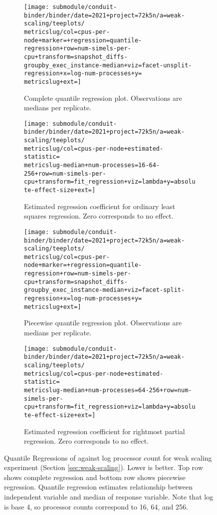 \begin{figure*}
  \centering

  \begin{subfigure}[b]{0.49\textwidth}
    \centering
    \texttt{[image: submodule/conduit-binder/binder/date=2021+project=72k5n/a=weak-scaling/teeplots/\\metricslug/col=cpus-per-node+marker=+regression=quantile-regression+row=num-simels-per-cpu+transform=snapshot\_diffs-groupby\_exec\_instance-median+viz=facet-unsplit-regression+x=log-num-processes+y=\\metricslug+ext=]}
    \caption{
      Complete quantile regression plot.
      Observations are medians per replicate.
    }
    \label{fig:weak-scaling-regression-quantile-\metricslug-complete-regression}
  \end{subfigure}%
  \hfill%
  \begin{subfigure}[b]{0.49\textwidth}
    \centering
    \texttt{[image: submodule/conduit-binder/binder/date=2021+project=72k5n/a=weak-scaling/teeplots/\\metricslug/col=cpus-per-node+estimated-statistic=\\metricslug-median+num-processes=16-64-256+row=num-simels-per-cpu+transform=fit\_regression+viz=lambda+y=absolute-effect-size+ext=]}
    \caption{Estimated regression coefficient for ordinary least squares regression. Zero corresponds to no effect.}
    \label{fig:weak-scaling-regression-quantile-\metricslug-complete-effect-size}
  \end{subfigure}

  \begin{subfigure}[b]{0.49\textwidth}
    \centering
    \texttt{[image: submodule/conduit-binder/binder/date=2021+project=72k5n/a=weak-scaling/teeplots/\\metricslug/col=cpus-per-node+marker=+regression=quantile-regression+row=num-simels-per-cpu+transform=snapshot\_diffs-groupby\_exec\_instance-median+viz=facet-split-regression+x=log-num-processes+y=\\metricslug+ext=]}
    \caption{
      Piecewise quantile regression plot.
      Observations are medians per replicate.
    }
    \label{fig:weak-scaling-regression-quantile-\metricslug-partial-regression}
  \end{subfigure}%
  \hfill%
  \begin{subfigure}[b]{0.49\textwidth}
    \centering
    \texttt{[image: submodule/conduit-binder/binder/date=2021+project=72k5n/a=weak-scaling/teeplots/\\metricslug/col=cpus-per-node+estimated-statistic=\\metricslug-median+num-processes=64-256+row=num-simels-per-cpu+transform=fit\_regression+viz=lambda+y=absolute-effect-size+ext=]}
    \caption{Estimated regression coefficient for rightmost partial regression. Zero corresponds to no effect.}
    \label{fig:weak-scaling-regression-quantile-\metricslug-partial-effect-size}
  \end{subfigure}
  \caption{
  Quantile Regressions of \metric{} against log processor count for weak scaling experiment (Section \ref{sec:weak-scaling}).
  Lower is better.
  Top row shows complete regression and bottom row shows piecewise regression.
  Quantile regression estimates relationship between independent variable and median of response variable.
  Note that log is base 4, so processor counts correspond to 16, 64, and 256.
  }
  \label{fig:weak-scaling-regression-quantile-\metricslug}
\end{figure*}
